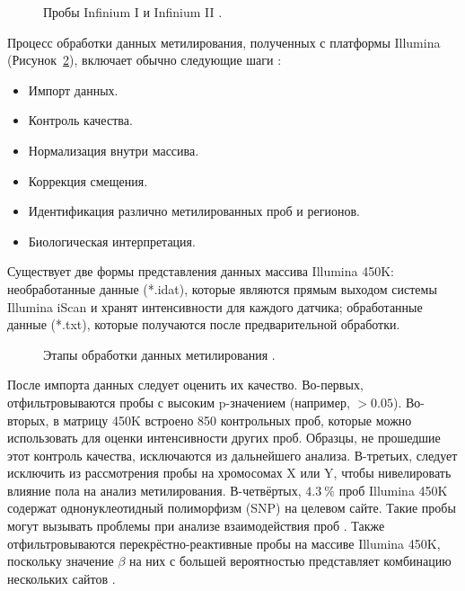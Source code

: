 \begin{figure}[ht]
	\caption[Пробы Infinium I и Infinium II.]{Пробы Infinium I и Infinium II \autocite{Nakabayashi2017}.}\label{fig:infinium}
\end{figure}

Процесс обработки данных метилирования, полученных с платформы Illumina (Рисунок~\ref{fig:pipeline}), включает обычно следующие шаги \autocite{Wang2018}: 
\begin{itemize}
	\item Импорт данных.
	\item Контроль качества.
	\item Нормализация внутри массива.
	\item Коррекция смещения.
	\item Идентификация различно метилированных проб и регионов.
	\item Биологическая интерпретация.
\end{itemize}

Существует две формы представления данных массива Illumina 450K: необработанные данные (*.idat), которые являются прямым выходом системы Illumina iScan и хранят интенсивности для каждого датчика; обработанные данные (*.txt), которые получаются после предварительной обработки. 

\begin{figure}[ht]
	\caption[Этапы обработки данных метилирования.]{Этапы обработки данных метилирования \autocite{WilhelmBenartzi2013}.}\label{fig:pipeline}
\end{figure}

После импорта данных следует оценить их качество. Во-первых, отфильтровываются пробы с высоким p-значением (например, $>0.05$). Во-вторых, в матрицу 450K встроено 850 контрольных проб, которые можно использовать для оценки интенсивности других проб. Образцы, не прошедшие этот контроль качества, исключаются из дальнейшего анализа. В-третьих, следует исключить из рассмотрения пробы на хромосомах X или Y, чтобы нивелировать влияние пола на анализ метилирования. В-четвёртых, $4.3~\%$ проб Illumina 450K содержат однонуклеотидный полиморфизм (SNP) на целевом сайте. Такие пробы могут вызывать проблемы при анализе взаимодействия проб \autocite{Price2013}. Также отфильтровываются перекрёстно-реактивные пробы на массиве Illumina 450K, поскольку значение $\beta$ на них с большей вероятностью представляет комбинацию нескольких сайтов \autocite{Zhou2016}.

